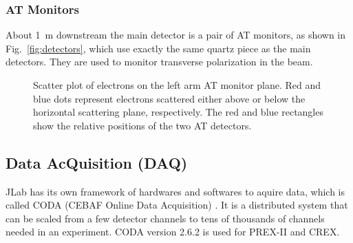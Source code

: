 \subsubsection{AT Monitors}
About 1~m downstream the main detector is a pair of AT monitors, as shown 
in Fig.~\ref{fig:detectors}, which use exactly the same quartz piece as the 
main detectors. They are used to monitor transverse polarization in the beam.
\begin{figure}[!h]
    \centering
    \caption{Scatter plot of electrons on the left arm AT monitor plane. 
    Red and blue dots represent electrons scattered either above or below the
    horizontal scattering plane, respectively. The red and blue rectangles
    show the relative positions of the two AT detectors. 
    }
\end{figure}

\subsection{Data AcQuisition (DAQ)}
JLab has its own framework of hardwares and softwares to aquire data, which
is called CODA (CEBAF Online Data Acquisition) \cite{CODA}. It is a distributed
system that can be scaled from a few detector channels to tens of thousands of
channels needed in an experiment. CODA version 2.6.2 is used for PREX-II and CREX.

